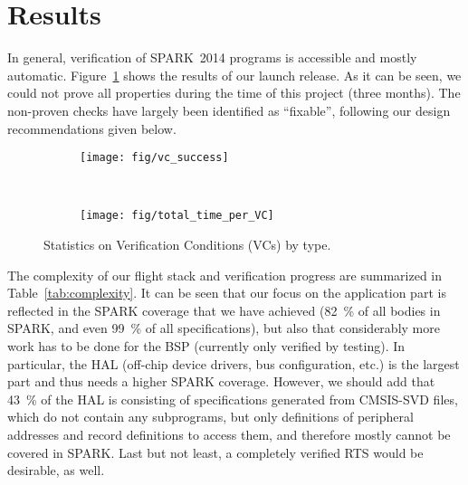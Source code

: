 \section{Results}
\label{sec:results}

In general, verification of SPARK~2014 programs is accessible and mostly
automatic.  Figure~\ref{fig:stats} shows
the results of our launch release. As it can be seen, we could not
prove all properties during the time of this project (three months). The non-proven
checks have largely been identified as ``fixable'', following our design recommendations given below.

\begin{figure}[hbtp]\vspace*{-4mm}
    \begin{subfigure}[t]{0.48\textwidth}
        \texttt{[image: fig/vc\_success]}
    \end{subfigure}
    ~
    \begin{subfigure}[t]{0.48\textwidth}
      \texttt{[image: fig/total\_time\_per\_VC]}
    \end{subfigure}%
    \caption{Statistics on Verification Conditions (VCs) by type.%
\vspace*{-3mm}}\label{fig:stats}
  \end{figure}

The complexity of our flight stack and verification progress are
summarized in Table~\ref{tab:complexity}. It can be seen that our
focus on the application part is reflected in the SPARK coverage that we
have achieved (\SI{82}{\percent} of all bodies in SPARK, and even
\SI{99}{\percent} of all specifications), but also that considerably more work has to
be done for the BSP (currently only verified by testing). In
particular, the HAL (off-chip device drivers, bus configuration, etc.)
is the largest part and thus needs a higher SPARK coverage.
However, we should add that \SI{43}{\percent} of the HAL is consisting of
specifications generated from CMSIS-SVD files, which do not contain any
subprograms, but only definitions of peripheral addresses and record definitions to access
them, and therefore mostly cannot be covered in SPARK. Last
but not least, a completely verified RTS would be desirable, as well.

